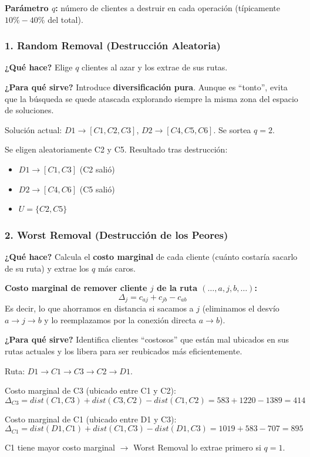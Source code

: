 \documentclass[12pt,a4paper]{article}
\begin{document}
\textbf{Parámetro $q$:} número de clientes a destruir en cada operación (típicamente $10\%-40\%$ del total).

\subsubsection{1. Random Removal (Destrucción Aleatoria)}

\textbf{¿Qué hace?} Elige $q$ clientes al azar y los extrae de sus rutas.

\textbf{¿Para qué sirve?} Introduce \textbf{diversificación pura}. Aunque es ``tonto'', evita que la búsqueda se quede atascada explorando siempre la misma zona del espacio de soluciones.

\begin{ejemplo}
Solución actual: $D1 \to [C1, C2, C3]$, $D2 \to [C4, C5, C6]$. Se sortea $q=2$.

Se eligen aleatoriamente C2 y C5. Resultado tras destrucción:
\begin{itemize}
\item $D1 \to [C1, C3]$ (C2 salió)
\item $D2 \to [C4, C6]$ (C5 salió)
\item $U = \{C2, C5\}$
\end{itemize}
\end{ejemplo}

\subsubsection{2. Worst Removal (Destrucción de los Peores)}

\textbf{¿Qué hace?} Calcula el \textbf{costo marginal} de cada cliente (cuánto costaría sacarlo de su ruta) y extrae los $q$ más caros.

\textbf{Costo marginal de remover cliente $j$ de la ruta $(\ldots, a, j, b, \ldots)$:}
$$\Delta_j = c_{aj} + c_{jb} - c_{ab}$$
Es decir, lo que ahorramos en distancia si sacamos a $j$ (eliminamos el desvío $a \to j \to b$ y lo reemplazamos por la conexión directa $a \to b$).

\textbf{¿Para qué sirve?} Identifica clientes ``costosos'' que están mal ubicados en sus rutas actuales y los libera para ser reubicados más eficientemente.

\begin{ejemplo}
Ruta: $D1 \to C1 \to C3 \to C2 \to D1$.

Costo marginal de C3 (ubicado entre C1 y C2):
$$\Delta_{C3} = dist(C1, C3) + dist(C3, C2) - dist(C1, C2) = 583 + 1220 - 1389 = 414$$

Costo marginal de C1 (ubicado entre D1 y C3):
$$\Delta_{C1} = dist(D1, C1) + dist(C1, C3) - dist(D1, C3) = 1019 + 583 - 707 = 895$$

C1 tiene mayor costo marginal $\to$ Worst Removal lo extrae primero si $q=1$.
\end{ejemplo}
\end{document}
